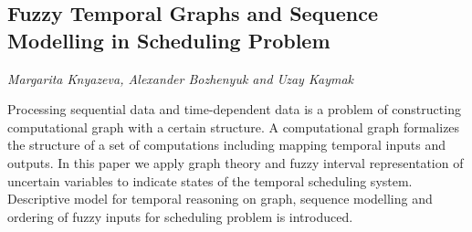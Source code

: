 \documentclass[../booklet.tex]{subfiles}
\begin{document}
\subsection[Fuzzy Temporal Graphs and Sequence Modelling in  Scheduling Problem. {\it Margarita Knyazeva, Alexander Bozhenyuk and Uzay Kaymak}]{Fuzzy Temporal Graphs and Sequence Modelling in  Scheduling Problem}
  

\begin{center}
  {\it Margarita Knyazeva, Alexander Bozhenyuk and Uzay Kaymak}
\end{center}


Processing sequential data and time-dependent data is a problem of constructing computational graph with a certain structure. A computational graph formalizes the structure of a set of computations including mapping temporal inputs and outputs. In this paper we apply graph theory and fuzzy interval representation of uncertain variables to indicate states of the temporal scheduling system. Descriptive model for temporal reasoning on graph, sequence modelling and ordering of fuzzy inputs for scheduling problem is introduced.

\end{document}
